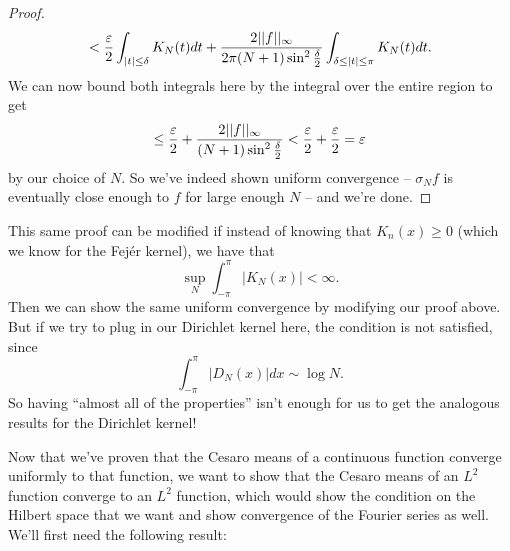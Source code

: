 \begin{proof}
\[
    < \frac{\varepsilon}{2}\int_{|t| \le \delta} K_N(t) dt + \frac{2||f||_\infty}{2\pi(N+1) \sin^2\frac{\delta}{2}} \int_{\delta \le |t| \le \pi} K_N(t) dt.
\]
We can now bound both integrals here by the integral over the entire region to get 
\[
    \le \frac{\varepsilon}{2} + \frac{2||f||_{\infty}}{(N+1) \sin^2\frac{\delta}{2}} < \frac{\varepsilon}{2} + \frac{\varepsilon}{2} = \varepsilon
\]
by our choice of $N$. So we've indeed shown uniform convergence -- $\sigma_N f$ is eventually close enough to $f$ for large enough $N$ -- and we're done. 
\end{proof}

\begin{remark}
This same proof can be modified if instead of knowing that $K_n(x) \ge 0$ (which we know for the Fej\'er kernel), we have that
\[
    \sup_N \int_{-\pi}^{\pi} |K_N(x)| < \infty.
\]
Then we can show the same uniform convergence by modifying our proof above. But if we try to plug in our Dirichlet kernel here, the condition is not satisfied, since 
\[
    \int_{-\pi}^{\pi} |D_N(x)| dx \sim \log N.
\]
So having ``almost all of the properties'' isn't enough for us to get the analogous results for the Dirichlet kernel!
\end{remark}

Now that we've proven that the Cesaro means of a continuous function converge uniformly to that function, we want to show that the Cesaro means of an $L^2$ function converge to an $L^2$ function, which would show the condition on the Hilbert space that we want and show convergence of the Fourier series as well. We'll first need the following result:

